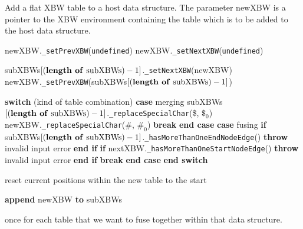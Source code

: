 \documentclass[a4paper,12pt,twoside,BCOR=10mm]{scrbook}
\newcommand{\StateInd}{\State\hspace{0.6cm}}
\newcommand{\StateIndd}{\State\hspace{1.2cm}}
\newcommand{\StateInddd}{\State\hspace{1.8cm}}
\begin{document}
\begin{algorithm}
\caption[Add a table to a host data structure]{Add a flat XBW table to a host data structure. The parameter newXBW is a pointer to the XBW environment containing the table which is to be added to the host data structure.}
\label{alg:addSubXBW}
\begin{algorithmic}[1]

\State newXBW.\texttt{\_setPrevXBW}(\texttt{undefined})
\State newXBW.\texttt{\_setNextXBW}(\texttt{undefined})

\State \phantom{nl}

	\State subXBWs$[ (\textrm{\textbf{length of} subXBWs}) - 1 ]$.\texttt{\_setNextXBW}(newXBW)
	\State newXBW.\texttt{\_setPrevXBW}(subXBWs$[ (\textrm{\textbf{length of} subXBWs}) - 1 ]$)

	\State \phantom{nl}

	\State \textbf{switch} (kind of table combination)
		\StateInd \textbf{case} merging
			\StateIndd subXBWs$[ (\textrm{\textbf{length of} subXBWs}) - 1 ]$.\texttt{\_replaceSpecialChar}(\texttt{\textquotesingle}\$\texttt{\textquotesingle}, \texttt{\textquotesingle}$\$_0$\texttt{\textquotesingle})
			\StateIndd newXBW.\texttt{\_replaceSpecialChar}(\texttt{\textquotesingle}$\#$\texttt{\textquotesingle}, \texttt{\textquotesingle}$\#_0$\texttt{\textquotesingle})
			\StateIndd \textbf{break}
		\StateInd \textbf{end case}
		\StateInd \textbf{case} fusing
			\StateIndd \textbf{if} subXBWs$[ (\textrm{\textbf{length of} subXBWs}) - 1 ]$.\texttt{\_hasMoreThanOneEndNodeEdge}()
				\StateInddd \textbf{throw} invalid input error
			\StateIndd \textbf{end if}
			\StateIndd \textbf{if} nextXBW.\texttt{\_hasMoreThanOneStartNodeEdge}()
				\StateInddd \textbf{throw} invalid input error
			\StateIndd \textbf{end if}
			\StateIndd \textbf{break}
		\StateInd \textbf{end case}
	\State \textbf{end switch}
\EndIf

\State \phantom{nl}

\State reset current positions within the new table to the start

\State \phantom{nl}

\State \textbf{append} newXBW \textbf{to} subXBWs

\end{algorithmic}
\end{algorithm}
once for each table that we want to fuse together within that data structure. 
\end{document}
